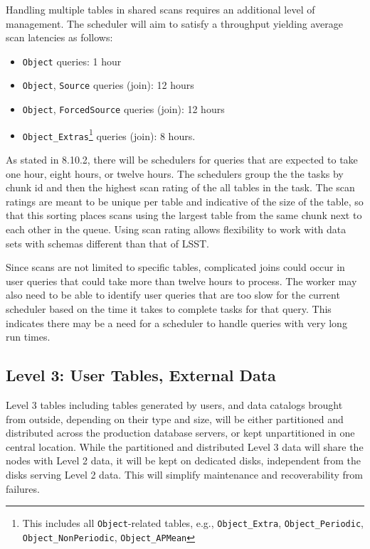 \documentclass[DM,lsstdraft,toc]{lsstdoc}
\begin{document}
Handling multiple tables in shared scans requires an additional level of
management. The scheduler will aim to satisfy a throughput yielding
average scan latencies as follows:

\begin{itemize}
\item
  \texttt{Object} queries: 1 hour
\item
  \texttt{Object}, \texttt{Source} queries (join): 12 hours
\item
  \texttt{Object}, \texttt{ForcedSource} queries (join): 12 hours
\item
  \texttt{Object\_Extras}\footnote{This includes all
    \texttt{Object}-related tables, e.g., \texttt{Object\_Extra},
    \texttt{Object\_Periodic}, \texttt{Object\_NonPeriodic},
    \texttt{Object\_APMean}} queries (join): 8 hours.
\end{itemize}

As stated in 8.10.2, there will be schedulers for queries that are
expected to take one hour, eight hours, or twelve hours. The schedulers
group the the tasks by chunk id and then the highest scan rating of the
all tables in the task. The scan ratings are meant to be unique per
table and indicative of the size of the table, so that this sorting
places scans using the largest table from the same chunk next to each
other in the queue. Using scan rating allows flexibility to work with
data sets with schemas different than that of LSST.

Since scans are not limited to specific tables, complicated joins could
occur in user queries that could take more than twelve hours to process.
The worker may also need to be able to identify user queries that are
too slow for the current scheduler based on the time it takes to
complete tasks for that query. This indicates there may be a need for a
scheduler to handle queries with very long run times.

\subsection{Level 3: User Tables, External
Data}\label{level-3-user-tables-external-data}

Level 3 tables including tables generated by users, and data catalogs
brought from outside, depending on their type and size, will be either
partitioned and distributed across the production database servers, or
kept unpartitioned in one central location. While the partitioned and
distributed Level 3 data will share the nodes with Level 2 data, it will
be kept on dedicated disks, independent from the disks serving Level 2
data. This will simplify maintenance and recoverability from failures.
\end{document}
